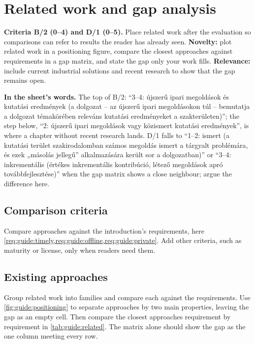 \section{Related work and gap analysis}\label{app:chapters:related}
\textbf{Criteria B/2 (0--4) and D/1 (0--5).} Place related work after the evaluation so comparisons can refer to results the reader has already seen.
\textbf{Novelty:} plot related work in a positioning figure, compare the closest approaches against requirements in a gap matrix, and state the gap only your work fills.
\textbf{Relevance:} include current industrial solutions and recent research to show that the gap remains open.

\textbf{In the sheet's words.} The top of B/2: \enquote{3--4: újszerű ipari megoldások és kutatási eredmények (a dolgozat -- az újszerű ipari megoldásokon túl -- bemutatja a dolgozat témakörében releváns kutatási eredményeket a szakterületen)}; the step below, \enquote{2: újszerű ipari megoldások vagy közismert kutatási eredmények}, is where a chapter without recent research lands. D/1 falls to \enquote{1--2: ismert (a kutatási terület szakirodalomban számos megoldás ismert a tárgyalt problémára, és ezek „másolás jellegű” alkalmazására került sor a dolgozatban)} or \enquote{3--4: inkrementális (értékes inkrementális kontribúció, létező megoldások apró továbbfejlesztése)} when the gap matrix shows a close neighbour; argue the difference here.

\subsection{Comparison criteria}\label{app:chapters:comparison-criteria}
Compare approaches against the introduction's requirements, here \cref{req:guide:timely,req:guide:offline,req:guide:private}. Add other criteria, such as maturity or license, only when readers need them.

\subsection[Existing approaches]{Existing approaches\skimmark}\label{app:chapters:existing-approaches}
Group related work into families and compare each against the requirements. Use \cref{fig:guide:positioning} to separate approaches by two main properties, leaving the gap as an empty cell. Then compare the closest approaches requirement by requirement in \cref{tab:guide:related}. The matrix alone should show the gap as the one column meeting every row.

